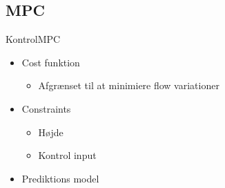 \subsection{MPC}

\begin{frame}{Kontrol}{MPC}
    \vfill\vfill\centering
\begin{itemize}
	\item Cost funktion
	\begin{itemize}
		\item Afgrænset til at minimiere flow variationer
	\end{itemize}
	\item Constraints
	\begin{itemize}
		\item Højde
		\item Kontrol input
	\end{itemize}
	\item Prediktions model
\end{itemize}
\vfill\vfill
\end{frame}





